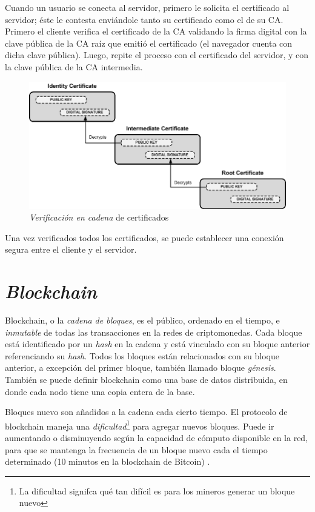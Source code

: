 Cuando un usuario se conecta al servidor, primero le solicita el certificado al servidor; éste le contesta enviándole tanto su certificado como el de su CA. Primero el cliente verifica el certificado de la CA validando la firma digital con la clave pública de la CA raíz que emitió el certificado (el navegador cuenta con dicha clave pública). Luego, repite el proceso con el certificado del servidor, y con la clave pública de la CA intermedia.

\begin{figure}[H]
    \centering
    \includegraphics[width=0.8\linewidth]{images/pki-chain-of-trust.png}
    \caption*{\emph{Verificación en cadena} de certificados \autocite{FirenetPKIChainOfTrust}}
\end{figure}

Una vez verificados todos los certificados, se puede establecer una conexión segura entre el cliente y el servidor.

\section{\emph{Blockchain}}

Blockchain, o la \emph{cadena de bloques}, es el  público, ordenado en el tiempo, e \emph{inmutable} de todas las transacciones en la redes de criptomonedas. Cada bloque está identificado por un \emph{hash} en la cadena y está vinculado con su bloque anterior referenciando su \emph{hash}. Todos los bloques están relacionados con su bloque anterior, a excepción del primer bloque, también llamado bloque \emph{génesis}. También se puede definir blockchain como una base de datos distribuida, en donde cada nodo tiene una copia entera de la base.

Bloques nuevo son añadidos a la cadena cada cierto tiempo. El protocolo de blockchain maneja una \emph{dificultad}\footnote{La dificultad signifca qué tan difícil es para los mineros generar un bloque nuevo} para agregar nuevos bloques. Puede ir aumentando o disminuyendo según la capacidad de cómputo disponible en la red, para que se mantenga la frecuencia de un bloque nuevo cada el tiempo determinado (10 minutos en la blockchain de Bitcoin) \autocite{MasteringBlockchainBlockchain}.

